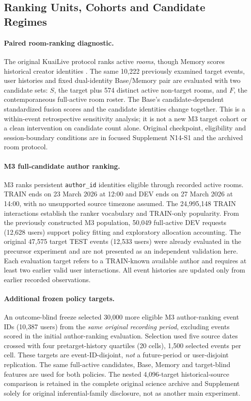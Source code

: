 \documentclass[preprint,12pt]{elsarticle}
\begin{document}
\subsection{Ranking Units, Cohorts and Candidate Regimes}
\label{sec:exp-data}

\paragraph{Paired room-ranking diagnostic.}
The original KuaiLive protocol ranks active \emph{rooms}, though Memory scores historical creator identities \cite{qu2026kuailive}. The same 10,222 previously examined target events, user histories and fixed dual-identity Base/Memory pair are evaluated with two candidate sets: $S$, the target plus 574 distinct active non-target rooms, and $F$, the contemporaneous full-active room roster. The Base's candidate-dependent standardized fusion scores and the candidate identities change together. This is a within-event retrospective sensitivity analysis; it is not a new M3 target cohort or a clean intervention on candidate count alone. Original checkpoint, eligibility and session-boundary conditions are in focused Supplement N14-S1 and the archived room protocol.

\paragraph{M3 full-candidate author ranking.}
M3 ranks persistent \texttt{author\_id} identities eligible through recorded active rooms. TRAIN ends on 23 March 2026 at 12:00 and DEV ends on 27 March 2026 at 14:00, with no unsupported source timezone assumed. The 24,995,148 TRAIN interactions establish the ranker vocabulary and TRAIN-only popularity. From the previously constructed M3 population, 50,049 full-active DEV requests (12,628 users) support policy fitting and exploratory allocation accounting. The original 47,575 target TEST events (12,533 users) were already evaluated in the precursor experiment and are not presented as an independent validation here. Each evaluation target refers to a TRAIN-known available author and requires at least two earlier valid user interactions. All event histories are updated only from earlier recorded observations.

\paragraph{Additional frozen policy targets.}
An outcome-blind freeze selected 30,000 more eligible M3 author-ranking event IDs (10,387 users) from the \emph{same original recording period}, excluding events scored in the initial author-ranking evaluation. Selection used five source dates crossed with four pretarget-history quartiles (20 cells), 1,500 selected events per cell. These targets are event-ID-disjoint, \emph{not} a future-period or user-disjoint replication. The same full-active candidates, Base, Memory and target-blind features are used for both policies. The nested 4,096-target historical-source comparison is retained in the complete original science archive and Supplement solely for original inferential-family disclosure, not as another main experiment.
\end{document}
